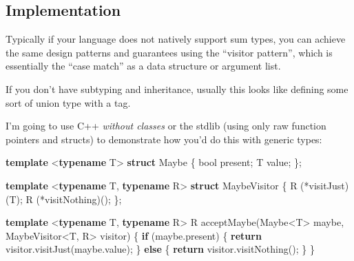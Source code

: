 \documentclass[]{article}
\newenvironment{Shaded}{}{}
\newcommand{\ControlFlowTok}[1]{\textcolor[rgb]{0.00,0.44,0.13}{\textbf{#1}}}
\newcommand{\DataTypeTok}[1]{\textcolor[rgb]{0.56,0.13,0.00}{#1}}
\newcommand{\KeywordTok}[1]{\textcolor[rgb]{0.00,0.44,0.13}{\textbf{#1}}}
\newcommand{\NormalTok}[1]{#1}
\newcommand{\OperatorTok}[1]{\textcolor[rgb]{0.40,0.40,0.40}{#1}}
\begin{document}
\subsection{Implementation}\label{implementation}

Typically if your language does not natively support sum types, you can achieve
the same design patterns and guarantees using the ``visitor pattern'', which is
essentially the ``case match'' as a data structure or argument list.

If you don't have subtyping and inheritance, usually this looks like defining
some sort of union type with a tag.

I'm going to use C++ \emph{without classes} or the stdlib (using only raw
function pointers and structs) to demonstrate how you'd do this with generic
types:

\begin{Shaded}
\begin{Highlighting}[]
\KeywordTok{template} \OperatorTok{\textless{}}\KeywordTok{typename}\NormalTok{ T}\OperatorTok{\textgreater{}}
\KeywordTok{struct}\NormalTok{ Maybe }\OperatorTok{\{}
    \DataTypeTok{bool}\NormalTok{ present}\OperatorTok{;}
\NormalTok{    T value}\OperatorTok{;}
\OperatorTok{\};}

\KeywordTok{template} \OperatorTok{\textless{}}\KeywordTok{typename}\NormalTok{ T}\OperatorTok{,} \KeywordTok{typename}\NormalTok{ R}\OperatorTok{\textgreater{}}
\KeywordTok{struct}\NormalTok{ MaybeVisitor }\OperatorTok{\{}
\NormalTok{    R }\OperatorTok{(*}\NormalTok{visitJust}\OperatorTok{)(}\NormalTok{T}\OperatorTok{);}
\NormalTok{    R }\OperatorTok{(*}\NormalTok{visitNothing}\OperatorTok{)();}
\OperatorTok{\};}

\KeywordTok{template} \OperatorTok{\textless{}}\KeywordTok{typename}\NormalTok{ T}\OperatorTok{,} \KeywordTok{typename}\NormalTok{ R}\OperatorTok{\textgreater{}}
\NormalTok{R acceptMaybe}\OperatorTok{(}\NormalTok{Maybe}\OperatorTok{\textless{}}\NormalTok{T}\OperatorTok{\textgreater{}}\NormalTok{ maybe}\OperatorTok{,}\NormalTok{ MaybeVisitor}\OperatorTok{\textless{}}\NormalTok{T}\OperatorTok{,}\NormalTok{ R}\OperatorTok{\textgreater{}}\NormalTok{ visitor}\OperatorTok{)} \OperatorTok{\{}
    \ControlFlowTok{if} \OperatorTok{(}\NormalTok{maybe}\OperatorTok{.}\NormalTok{present}\OperatorTok{)} \OperatorTok{\{}
        \ControlFlowTok{return}\NormalTok{ visitor}\OperatorTok{.}\NormalTok{visitJust}\OperatorTok{(}\NormalTok{maybe}\OperatorTok{.}\NormalTok{value}\OperatorTok{);}
    \OperatorTok{\}} \ControlFlowTok{else} \OperatorTok{\{}
        \ControlFlowTok{return}\NormalTok{ visitor}\OperatorTok{.}\NormalTok{visitNothing}\OperatorTok{();}
    \OperatorTok{\}}
\OperatorTok{\}}
\end{Highlighting}
\end{Shaded}
\end{document}
